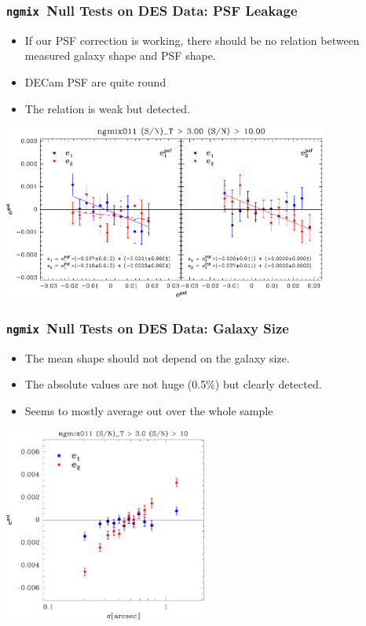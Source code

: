 \documentclass{beamer}
\newcommand{\ngmix}{\texttt{ngmix}}
\begin{document}
\frame
{
    \frametitle{\ngmix\ Null Tests on DES Data: PSF Leakage}

    \begin{itemize}

        \item If our PSF correction is working, there should be no relation between
            measured galaxy shape and PSF shape.

        \item DECam PSF are quite round 

        \item The relation is weak but detected.

    \end{itemize}


    \begin{center}
        \includegraphics[width=0.8\textwidth]{ngmix011-e-vs-epsf-Ts2n-min-300-s2n-min-10.pdf}
    \end{center}

}


\frame
{
    \frametitle{\ngmix\ Null Tests on DES Data: Galaxy Size}

    \begin{itemize}

        \item The mean shape should not depend on the galaxy size.

        \item The absolute values are not huge (0.5\%) but clearly detected.
        
        \item Seems to mostly average out over the whole sample

    \end{itemize}


    \begin{center}
        \includegraphics[width=0.5\textwidth]{ngmix011-e-vs-sigma-mx-50-Ts2n-min-300-s2n-min-10.pdf}
    \end{center}

}
\end{document}
